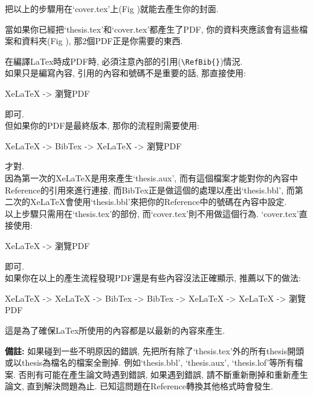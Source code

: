 \newpage
把以上的步驟用在`cover.tex'上(Fig )就能去產生你的封面.


當如果你已經把`thesis.tex'和`cover.tex'都產生了PDF, 你的資料夾應該會有這些檔案和資料夾(Fig ), 那2個PDF正是你需要的東西.



\newpage
{}

在編譯LaTex時成PDF時, 必須注意內部的引用(\verb|\RefBib{}|)情況.\\

如果只是編寫內容, 引用的內容和號碼不是重要的話, 那直接使用:\\
\centerline{XeLaTeX -> 瀏覽PDF}
即可.\\

但如果你的PDF是最終版本, 那你的流程則需要使用:\\
\centerline{XeLaTeX -> BibTex -> XeLaTeX -> 瀏覽PDF}
才對.\\

因為第一次的XeLaTeX是用來產生`thesis.aux', 而有這個檔案才能對你的內容中Reference的引用來進行連接, 而BibTex正是做這個的處理以產出`thesis.bbl', 而第二次的XeLaTeX會使用`thesis.bbl'來把你的Reference中的號碼在內容中設定.\\

以上步驟只需用在`thesis.tex'的部份, 而`cover.tex'則不用做這個行為. `cover.tex'直接使用:\\
\centerline{XeLaTeX -> 瀏覽PDF}
即可.\\

如果你在以上的產生流程發現PDF還是有些內容沒法正確顯示, 推薦以下的做法:
\centerline{XeLaTeX -> XeLaTeX -> BibTex -> BibTex -> XeLaTeX -> XeLaTeX -> 瀏覽PDF}
這是為了確保LaTex所使用的內容都是以最新的內容來產生.

\textbf{備註:} 如果碰到一些不明原因的錯誤, 先把所有除了`thesis.tex'外的所有thesis開頭或以thesis為檔名的檔案全刪掉. 例如`thesis.bbl', `thesis.aux', `thesis.lof'等所有檔案. 否則有可能在產生論文時遇到錯誤, 如果遇到錯誤, 請不斷重新刪掉和重新產生論文, 直到解決問題為止. 已知這問題在Reference轉換其他格式時會發生.

